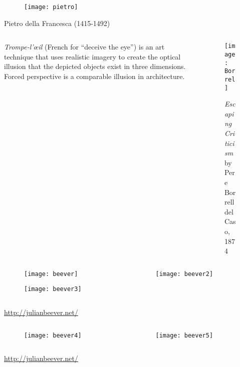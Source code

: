 \begin{frame}
\centering
\begin{figure}[!h]
\centering
\texttt{[image: pietro]}
\end{figure}
Pietro della Francesca (1415-1492)
\end{frame}

\begin{frame}
\begin{columns}
\begin{column}{.5\textwidth}
\begin{block}{\textit{Trompe-l'œil} (French for ``deceive the eye'')}
{is an art technique that uses realistic imagery to create the optical illusion that the depicted objects exist in three dimensions. Forced perspective is a comparable illusion in architecture.}
\end{block}
\end{column}
\begin{column}{.5\textwidth}
\begin{figure}[!h]
\centering
\texttt{[image: Borrel]}
\caption{\textit{Escaping Criticism} by Pere Borrell del Caso, 1874}
\end{figure}
\end{column}
\end{columns}
\end{frame}

\begin{frame}
\begin{columns}
\begin{column}{.6\textwidth}
\begin{figure}[!h]
\centering
\texttt{[image: beever]}
\end{figure}
\begin{figure}[!h]
\centering
\texttt{[image: beever3]}
\end{figure}
\end{column}
\begin{column}{.4\textwidth}
\begin{figure}[!h]
\centering
\texttt{[image: beever2]}
\end{figure}
\end{column}
\end{columns}
\centering
\url{http://julianbeever.net/}
\end{frame}

\begin{frame}
\begin{columns}
\begin{column}{.5\textwidth}
\begin{figure}[!h]
\centering
\texttt{[image: beever4]}
\end{figure}
\end{column}
\begin{column}{.5\textwidth}
\begin{figure}[!h]
\centering
\texttt{[image: beever5]}
\end{figure}
\end{column}
\end{columns}
\url{http://julianbeever.net/}
\end{frame}

